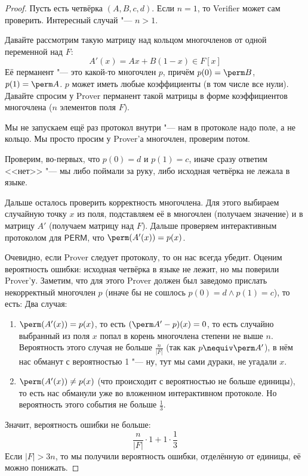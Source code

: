 	\begin{proof}
		Пусть есть четвёрка $(A, B, c, d)$.
		Если $n=1$, то Verifier может сам проверить.
		Интересный случай "--- $n>1$.

		Давайте рассмотрим такую матрицу над кольцом многочленов от одной переменной над $F$:
		\[ A'(x) = Ax + B(1-x) \in F[x] \]
		Её перманент "--- это какой-то многочлен $p$, причём $p(0)=\perm B$, $p(1)=\perm A$.
		$p$ может иметь любые коэффициенты (в том числе все нули).
		Давайте спросим у Prover перманент такой матрицы в форме коэффициентов многочлена ($n$ элементов поля $F$).
		\begin{Rem}
			Мы не запускаем ещё раз протокол внутри "--- нам в протоколе надо поле, а не кольцо.
			Мы просто просим у Prover'а многочлен, проверим потом.
		\end{Rem}
		Проверим, во-первых, что $p(0)=d$ и $p(1)=c$, иначе сразу ответим <<нет>> "--- мы либо поймали за руку, либо исходная четвёрка не лежала в языке.

		Дальше осталось проверить корректность многочлена.
		Для этого выбираем случайную точку $x$ из поля, подставляем её в многочлен (получаем значение) и в матрицу $A'$ (получаем матрицу над $F$).
		Дальше проверяем интерактивным протоколом для $\mathsf{PERM}$, что $\perm (A'(x)) = p(x)$.

		Очевидно, если Prover следует протоколу, то он нас всегда убедит.
		Оценим вероятность ошибки: исходная четвёрка в языке не лежит, но мы поверили Prover'у.
		Заметим, что для этого Prover должен был заведомо прислать некорректный многочлен $p$ (иначе бы не сошлось $p(0)=d \land p(1)=c$),
		то есть:
		Два случая:
		\begin{enumerate}
			\item
				$\perm (A'(x)) = p(x)$, то есть $(\perm A' - p)(x) = 0$, то есть случайно выбранный из поля $x$ попал в корень многочлена степени не выше $n$.
				Вероятность этого случая не больше $\frac{n}{|F|}$ (так как $p \nequiv \perm A'$), в нём нас обманут с вероятностью 1 "--- ну, тут мы сами дураки, не угадали $x$.
			\item
				$\perm (A'(x)) \neq p(x)$ (что происходит с вероятностью не больше единицы), то есть нас обманули уже во вложенном интерактивном протоколе.
				Но вероятность этого события не больше $\frac 13$.
		\end{enumerate}
		Значит, вероятность ошибки не больше:
		\[ \frac{n}{|F|} \cdot 1 + 1 \cdot \frac 13 \]
		Если $|F| > 3n$, то мы получили вероятность ошибки, отделённую от единицы, её можно понижать.
	\end{proof}

